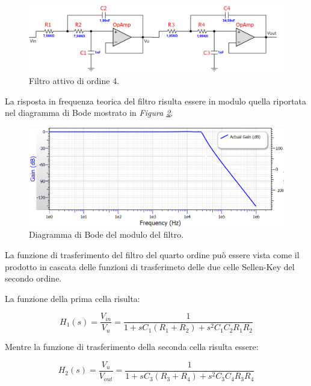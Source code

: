 \documentclass[titlepage]{report}
\begin{document}
	\begin{figure}[H]
		\centering
		\includegraphics[scale=0.9]{Immagini/sch_lp4.png}
		\caption{Filtro attivo di ordine 4.}
		\label{fig:LP4}
	\end{figure}	
	
	\noindent La risposta in frequenza teorica del filtro risulta essere in modulo quella riportata nel diagramma di Bode mostrato in \textit{Figura \ref{fig:BodeLp4}}.
	
	\begin{figure}[H]
		\centering
		\includegraphics[scale=0.9]{Immagini/bode_teorico_lp4.png}
		\caption{Diagramma di Bode del modulo del filtro.}
		\label{fig:BodeLp4}
	\end{figure}

	La funzione di trasferimento del filtro del quarto ordine può essere vista come il prodotto in cascata delle funzioni di trasferimeto delle due celle Sellen-Key del secondo ordine.

	La funzione della prima cella risulta:

	\begin{equation}
		\label{eq:sallen-key-1}
		H_1(s) = \frac{V_{in}}{V_u}  =  \frac{1}{1 + sC_1(R_1 + R_2)+ s^2C_1C_2R_1R_2 } 
	\end{equation}

	Mentre la funzione di trasferimento della seconda cella risulta essere:

	\begin{equation}
		\label{eq:sallen-key-2}
		H_2(s) = \frac{V_u}{V_{out}}  = \frac{1}{1 + sC_3(R_3 + R_4)+ s^2C_3C_4R_3R_4 } 
	\end{equation}
\end{document}
